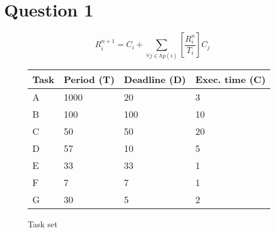 \section{Question 1}

    $$R_i^{n+1} = C_i + \sum\limits_{\forall j \in hp(i)} \left[\frac{R_i^n}{T_i}\right] C_j$$

    \renewcommand{\arraystretch}{1.4}
        \begin{figure}[H]
        \centering
        \begin{minipage}{0.5\textwidth}
            \begin{table}[H]
            \centering
                \begin{tabular}{|l|l|l|l|}
                \hline
                \rowcolor{blue!60}\textbf{Task} & \textbf{Period (T)} & \textbf{Deadline (D)} & \textbf{Exec. time (C)} \\ \hline
                A   & 1000  & 20    & 3     \\ \hline
                B   & 100   & 100   & 10    \\ \hline
                C   & 50    & 50    & 20    \\ \hline
                D   & 57    & 10    & 5     \\ \hline
                E   & 33    & 33    & 1     \\ \hline
                F   & 7     & 7     & 1     \\ \hline
                G   & 30    & 5     & 2     \\ \hline
                \end{tabular}
            \end{table}
        \end{minipage}
        \caption{Task set}
        \label{fig:tasks}
        \end{figure}
    \renewcommand{\arraystretch}{1.0}

